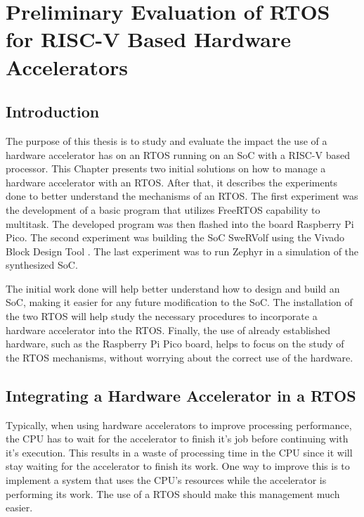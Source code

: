 \chapter{Preliminary Evaluation of RTOS for RISC-V Based Hardware Accelerators}
\label{chapter:PreliminaryWork}
\section{Introduction}
The purpose of this thesis is to study and evaluate the impact the use of a hardware accelerator has on an RTOS running on an SoC with a RISC-V based processor. This Chapter presents two initial solutions on how to manage a hardware accelerator with an RTOS. After that, it describes the experiments done to better understand the mechanisms of an RTOS. The first experiment was the development of a basic program that utilizes FreeRTOS capability to multitask. The developed program was then flashed into the board Raspberry Pi Pico. The second experiment was building the SoC SweRVolf using the Vivado Block Design Tool \cite{Vivado}. The last experiment was to run Zephyr in a simulation of the synthesized SoC.

The initial work done will help better understand how to design and build an SoC, making it easier for any future modification to the SoC. The installation of the two RTOS will help study the necessary procedures to incorporate a hardware accelerator into the RTOS. Finally, the use of already established hardware, such as the Raspberry Pi Pico board, helps to focus on the study of the RTOS mechanisms, without worrying about the correct use of the hardware.



\section{Integrating a Hardware Accelerator in a RTOS}
Typically, when using hardware accelerators to improve processing performance, the CPU has to wait for the accelerator to finish it's job before continuing with it's execution. This results in a waste of processing time in the CPU since it will stay waiting for the accelerator to finish its work. One way to improve this is to implement a system that uses the CPU's resources while the accelerator is performing its work. The use of a RTOS should make this management much easier.

